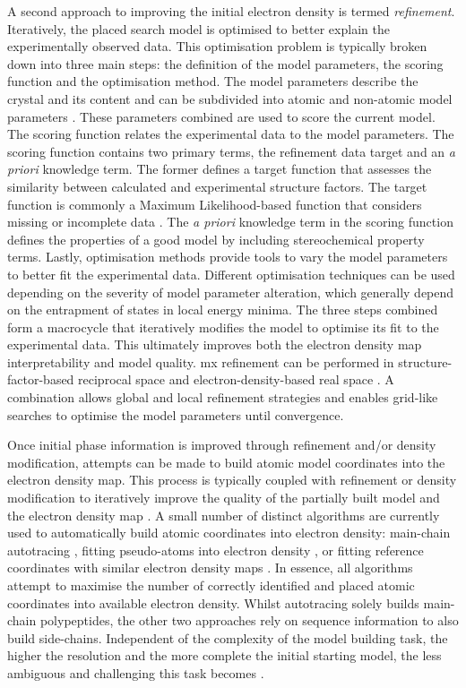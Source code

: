 A second approach to improving the initial electron density is termed \textit{refinement}. Iteratively, the placed search model is optimised to better explain the experimentally observed data. This optimisation problem is typically broken down into three main steps: the definition of the model parameters, the scoring function and the optimisation method. The model parameters describe the crystal and its content and can be subdivided into atomic and non-atomic model parameters \cite{Afonine2012-bg}. These parameters combined are used to score the current model. The scoring function relates the experimental data to the model parameters. The scoring function contains two primary terms, the refinement data target and an \textit{a priori} knowledge term. The former defines a target function that assesses the similarity between calculated and experimental structure factors. The target function is commonly a Maximum Likelihood-based function that considers missing or incomplete data \cite{Murshudov2011-ww,Afonine2012-bg}. The \textit{a priori} knowledge term in the scoring function defines the properties of a good model by including stereochemical property terms. Lastly, optimisation methods provide tools to vary the model parameters to better fit the experimental data. Different optimisation techniques can be used depending on the severity of model parameter alteration, which generally depend on the entrapment of states in local energy minima. The three steps combined form a macrocycle that iteratively modifies the model to optimise its fit to the experimental data. This ultimately improves both the electron density map interpretability and model quality. \gls{mx} refinement can be performed in structure-factor-based reciprocal space and electron-density-based real space \cite{Afonine2012-bg}. A combination allows global and local refinement strategies and enables grid-like searches to optimise the model parameters until convergence.

Once initial phase information is improved through refinement and/or density modification, attempts can be made to build atomic model coordinates into the electron density map. This process is typically coupled with refinement or density modification to iteratively improve the quality of the partially built model and the electron density map \cite{Rupp2010-nc}. A small number of distinct algorithms are currently used to automatically build atomic coordinates into electron density: main-chain autotracing \cite{Sheldrick2010-cx}, fitting pseudo-atoms into electron density \cite{Lamzin2001-cn}, or fitting reference coordinates with similar electron density maps \cite{Terwilliger2004-ig,Cowtan2006-xv}. In essence, all algorithms attempt to maximise the number of correctly identified and placed atomic coordinates into available electron density. Whilst autotracing solely builds main-chain polypeptides, the other two approaches rely on sequence information to also build side-chains. Independent of the complexity of the model building task, the higher the resolution and the more complete the initial starting model, the less ambiguous and challenging this task becomes \cite{Rupp2010-nc}. 

